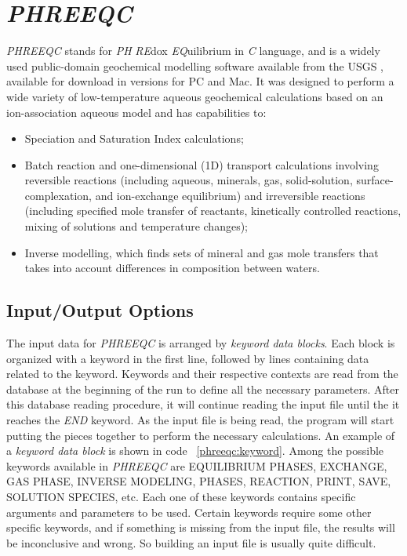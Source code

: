 \section{\emph{PHREEQC}}
\emph{PHREEQC} stands for \emph{PH} \emph{RE}dox \emph{EQ}uilibrium in \emph{C} language, and is a widely used public-domain geochemical modelling software available from the USGS  \cite{Parkhurst:80}, available for download in versions for PC and Mac. It was designed to perform a wide variety of low-temperature aqueous geochemical calculations based on an ion-association aqueous model and has capabilities to:
\begin{itemize}
\item Speciation and Saturation Index calculations;
\item Batch reaction and one-dimensional (1D) transport calculations involving reversible reactions (including aqueous, minerals, gas, solid-solution, surface-complexation, and ion-exchange equilibrium) and irreversible reactions (including specified mole transfer of reactants, kinetically controlled reactions, mixing of solutions and temperature changes);
\item Inverse modelling, which finds sets of mineral and gas mole transfers that takes into account differences in composition between waters.
\end{itemize}

\subsection{Input/Output Options}
The input data for \emph{PHREEQC} is arranged by \emph{keyword data blocks}. Each block is organized with a keyword in the first line, followed by lines containing data related to the keyword. Keywords and their respective contexts are read from the database at the beginning of the run to define all the necessary parameters. After this database reading procedure, it will continue reading the input file until the it reaches the \emph{END} keyword. As the input file is being read, the program will start putting the pieces together to perform the necessary calculations. An example of a \emph{keyword data block} is shown in code ~\ref{phreeqc:keyword}. Among the possible keywords available in \emph{PHREEQC} are EQUILIBRIUM PHASES, EXCHANGE, GAS PHASE, INVERSE MODELING, PHASES, REACTION, PRINT, SAVE, SOLUTION SPECIES, etc. Each one of these keywords contains specific arguments and parameters to be used. Certain keywords require some other specific keywords, and if something is missing from the input file, the results will be inconclusive and wrong. So building an input file is usually quite difficult. 


